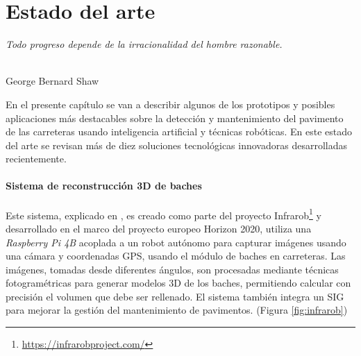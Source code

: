 \chapter{Estado del arte}
\label{cap:capitulo2}

\begin{flushright}
\begin{minipage}[]{10cm}
\emph{Todo progreso depende de la irracionalidad del hombre razonable.}\\
\end{minipage}\\

George Bernard Shaw\\
\end{flushright}

\vspace{1cm}

En el presente capítulo se van a describir algunos de los prototipos y posibles aplicaciones más destacables sobre la detección y mantenimiento del pavimento de las carreteras usando inteligencia artificial y técnicas robóticas. En este estado del arte se revisan más de diez soluciones tecnológicas innovadoras desarrolladas recientemente.
  


\subsubsection{Sistema de reconstrucción 3D de baches}

\setcounter{footnote}{27} 
Este sistema, explicado en \cite{s23135860}, es creado como parte del proyecto Infrarob\footnote{\url{https://infrarobproject.com/}} y desarrollado en el marco del proyecto europeo Horizon 2020, utiliza una \textit{Raspberry Pi 4B} acoplada a un robot autónomo para capturar imágenes usando una cámara y coordenadas \acs{GPS}, usando el módulo  de baches en carreteras. Las imágenes, tomadas desde diferentes ángulos, son procesadas mediante técnicas fotogramétricas para generar modelos 3D de los baches, permitiendo calcular con precisión el volumen que debe ser rellenado. El sistema también integra un \ac{SIG} para mejorar la gestión del mantenimiento de pavimentos. (Figura \ref{fig:infrarob})

